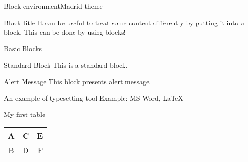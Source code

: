 \documentclass{beamer}
\begin{document}
 \begin{frame}{Block environment}{Madrid theme}
 \begin{block}{Block title}
    It can be useful to treat some content differently by putting it into a block. This can be done by using blocks!
\end{block}
 \end{frame}

 \begin{frame}{Basic Blocks}
    \begin{block}{Standard Block}
        This is a standard block.
    \end{block}
    \begin{alertblock}{Alert Message}
        This block presents alert message.
    \end{alertblock}
    \begin{exampleblock}{An example of typesetting tool}
        Example: MS Word, \LaTeX{}
    \end{exampleblock}
\end{frame}


\begin{frame}{My first table}
 \begin{tabular}{|c||l||r|}
 \hline
\hline
    A & C & E\\ 
\hline
   B & D & F\\ 
\hline
\end{tabular}
\end{frame}
\end{document}
